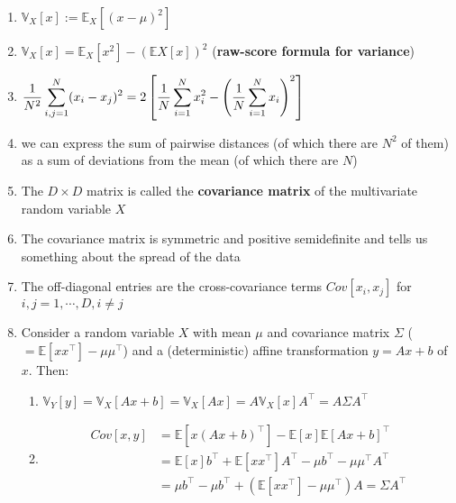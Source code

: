 \begin{enumerate}[itemsep=0.2cm]
    \item $\mathbb{V}_X[x] := \mathbb{E}_X[(x - \mu)^2]$

    \item $\mathbb{V}_X[x] = \mathbb{E}_X[x^2] - (\mathbb{E}X[x])^2$ \hfill (\textbf{raw-score formula for variance})

    \item $
        \dfrac{1}{N^2}
        \displaystyle\sum_{i,j=1}^{N} (x_i - x_j)^2
        = 2 \left[ 
            \dfrac{1}{N}\displaystyle\sum_{i=1}^{N} x_i^2
            -
            \left( 
                \dfrac{1}{N}\displaystyle\sum_{i=1}^{N} x_i 
            \right)^2
        \right]
    $

    \item we can express the sum of pairwise distances (of which there are $N^2$ of them) as a sum of deviations from the mean (of which there are $N$)

    \item The $D\times D$ matrix is called the \textbf{covariance matrix} of the multivariate random variable $X$

    \item The covariance matrix is symmetric and positive semidefinite and tells us something about the spread of the data

    \item The off-diagonal entries are the cross-covariance terms $Cov[x_i, x_j]$ for $i, j = 1, \cdots , D, i \neq j$

    \item Consider a random variable $X$ with mean $\mu$  and covariance matrix $\Sigma$ ($= \mathbb{E}[xx^\top] - \mu \mu ^\top$) and a (deterministic) affine transformation $y = Ax + b$ of $x$. Then:
    \begin{enumerate}
        \item $
            \mathbb{V}_Y[y] 
            = \mathbb{V}_X[Ax + b] 
            = \mathbb{V}_X[Ax] 
            = A\mathbb{V}_X[x]A^\top = A\Sigma A^\top
        $

        \item 
        \begin{align*}
            Cov[x, y] 
            &= \mathbb{E}[x(Ax + b)^\top ] - \mathbb{E}[x]\mathbb{E}[Ax + b]^\top \\
            &= \mathbb{E}[x]b^\top  + \mathbb{E}[xx^\top ]A^\top  - \mu b^\top  - \mu \mu ^\top A^\top \\
            &= \mu b^\top  - \mu b^\top  + (\mathbb{E}[xx^\top ] - \mu \mu ^\top )A =  \Sigma A^\top
        \end{align*}


\end{enumerate}
\end{enumerate}
